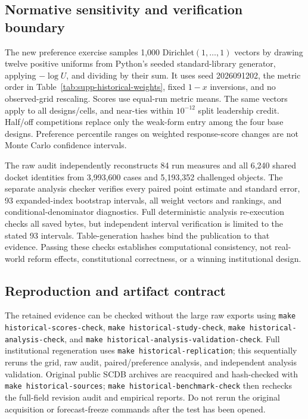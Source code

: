 \documentclass[
  journal=small,
  manuscript=research-article,
  year=2026
]{cup-journal}
\begin{document}



\subsection*{Normative sensitivity and verification boundary}

The new preference exercise samples 1,000 Dirichlet$(1,\ldots,1)$ vectors by drawing twelve positive uniforms from Python's seeded standard-library generator, applying $-\log U$, and dividing by their sum. It uses seed 2026091202, the metric order in Table~\ref{tab:supp-historical-weights}, fixed $1-x$ inversions, and no observed-grid rescaling. Scores use equal-run metric means. The same vectors apply to all designs/cells, and near-ties within $10^{-12}$ split leadership credit. Half/off competitions replace only the weak-form entry among the four base designs. Preference percentile ranges on weighted response-score changes are not Monte Carlo confidence intervals.




The raw audit independently reconstructs 84 run measures and all 6,240 shared docket identities from 3,993,600 cases and 5,193,352 challenged objects. The separate analysis checker verifies every paired point estimate and standard error, 93 expanded-index bootstrap intervals, all weight vectors and rankings, and conditional-denominator diagnostics. Full deterministic analysis re-execution checks all saved bytes, but independent interval verification is limited to the stated 93 intervals. Table-generation hashes bind the publication to that evidence. Passing these checks establishes computational consistency, not real-world reform effects, constitutional correctness, or a winning institutional design.

\subsection*{Reproduction and artifact contract}

The retained evidence can be checked without the large raw exports using \texttt{make historical-scores-check}, \texttt{make historical-study-check}, \texttt{make historical-analysis-check}, and \texttt{make historical-analysis-validation-check}. Full institutional regeneration uses \texttt{make historical-replication}; this sequentially reruns the grid, raw audit, paired/preference analysis, and independent analysis validation. Original public SCDB archives are reacquired and hash-checked with \texttt{make historical-sources}; \texttt{make historical-benchmark-check} then rechecks the full-field revision audit and empirical reports. Do not rerun the original acquisition or forecast-freeze commands after the test has been opened.
\end{document}
